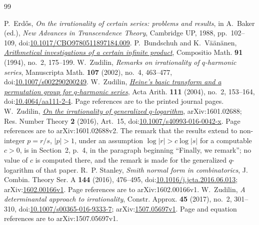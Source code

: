 \documentclass[11pt]{article}
\begin{document}

\begin{thebibliography}{99}
\small
\raggedright
\setlength{\itemsep}{2pt}
 P.~Erd\H{o}s, \emph{On the irrationality of certain series:
  problems and results}, in A.~Baker (ed.), \emph{New Advances in Transcendence
  Theory}, Cambridge UP, 1988, pp.~102--109,
  doi:\href{https://doi.org/10.1017/CBO9780511897184.009}{10.1017/CBO9780511897184.009}.
 P.~Bundschuh and K.~V\"a\"an\"anen,
  \href{https://numdam.org/item/CM_1994__91_2_175_0.pdf}{\emph{Arithmetical
  investigations of a certain infinite product}},
  Compositio Math. \textbf{91} (1994), no.~2, 175--199.
 W.~Zudilin, \emph{Remarks on irrationality of
  \(q\)-harmonic series}, Manuscripta Math. \textbf{107} (2002), no.~4,
  463--477,
  doi:\href{https://doi.org/10.1007/s002290200249}{10.1007/s002290200249}.
 W.~Zudilin,
  \href{https://geodesic.mathdoc.fr/articles/10.4064/aa111-2-4/}{\emph{Heine's
  basic transform and a permutation group for \(q\)-harmonic series}},
  Acta Arith. \textbf{111} (2004), no.~2, 153--164,
  doi:\href{https://doi.org/10.4064/aa111-2-4}{10.4064/aa111-2-4}.
  Page references are to the printed journal pages.
 W.~Zudilin,
  \href{https://arxiv.org/abs/1601.02688v2}{\emph{On the irrationality of
  generalized \(q\)-logarithm}}, arXiv:1601.02688; Res. Number Theory
  \textbf{2} (2016), Art.~15,
  doi:\href{https://doi.org/10.1007/s40993-016-0042-x}{10.1007/s40993-016-0042-x}.
  Page references are to arXiv:1601.02688v2.
  The remark that the results extend to non-integer \(p=r/s\), \(|p|>1\), under
  an assumption \(\log|r|>c\log|s|\) for a computable \(c>0\), is in Section~2,
  p.~4, in the paragraph beginning ``Finally, we remark''; no value of \(c\) is
  computed there, and the remark is made for the generalized \(q\)-logarithm of
  that paper.
 R.~P. Stanley, \emph{Smith normal form in combinatorics},
  J. Combin. Theory Ser. A \textbf{144} (2016), 476--495,
  doi:\href{https://doi.org/10.1016/j.jcta.2016.06.013}{10.1016/j.jcta.2016.06.013};
  arXiv:\href{https://arxiv.org/abs/1602.00166v1}{1602.00166v1}.
  Page references are to arXiv:1602.00166v1.
 W.~Zudilin, \emph{A determinantal approach to
  irrationality}, Constr. Approx. \textbf{45} (2017), no.~2, 301--310,
  doi:\href{https://doi.org/10.1007/s00365-016-9333-7}{10.1007/s00365-016-9333-7};
  arXiv:\href{https://arxiv.org/abs/1507.05697v1}{1507.05697v1}.
  Page and equation references are to arXiv:1507.05697v1.

\end{thebibliography}
\end{document}
